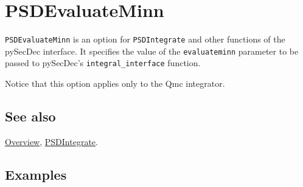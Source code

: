 \documentclass[../FeynHelpersManual.tex]{subfiles}
\begin{document}
\hypertarget{psdevaluateminn}{
\section{PSDEvaluateMinn}\label{psdevaluateminn}}

\texttt{PSDEvaluateMinn} is an option for \texttt{PSDIntegrate} and
other functions of the pySecDec interface. It specifies the value of the
\texttt{evaluateminn} parameter to be passed to pySecDec's
\texttt{integral_interface} function.

Notice that this option applies only to the Qmc integrator.

\subsection{See also}

\hyperlink{toc}{Overview}, \hyperlink{psdintegrate}{PSDIntegrate}.

\subsection{Examples}
\end{document}

